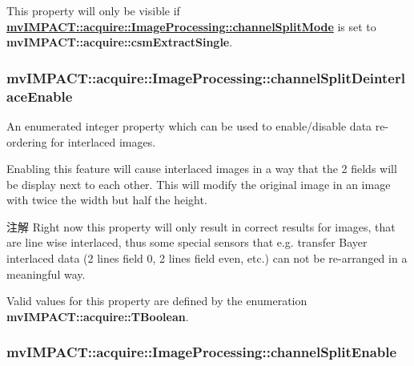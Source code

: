 This property will only be visible if {\bfseries \hyperlink{classmv_i_m_p_a_c_t_1_1acquire_1_1_image_processing_a29e6579bdae98ea9fe26b5f982b8cf24}{mv\+I\+M\+P\+A\+C\+T\+::acquire\+::\+Image\+Processing\+::channel\+Split\+Mode}} is set to {\bfseries mv\+I\+M\+P\+A\+C\+T\+::acquire\+::csm\+Extract\+Single}. \hypertarget{classmv_i_m_p_a_c_t_1_1acquire_1_1_image_processing_addba5c4a6e43745b7e4445cb60c89287}{
\subsubsection[{channel\+Split\+Deinterlace\+Enable}]{ mv\+I\+M\+P\+A\+C\+T\+::acquire\+::\+Image\+Processing\+::channel\+Split\+Deinterlace\+Enable}}\label{classmv_i_m_p_a_c_t_1_1acquire_1_1_image_processing_addba5c4a6e43745b7e4445cb60c89287}


An enumerated integer property which can be used to enable/disable data re-\/ordering for interlaced images. 

Enabling this feature will cause interlaced images in a way that the 2 fields will be display next to each other. This will modify the original image in an image with twice the width but half the height.

\begin{DoxyNote}{注解}
Right now this property will only result in correct results for images, that are line wise interlaced, thus some special sensors that e.\+g. transfer Bayer interlaced data (2 lines field 0, 2 lines field even, etc.) can not be re-\/arranged in a meaningful way.
\end{DoxyNote}
Valid values for this property are defined by the enumeration {\bfseries mv\+I\+M\+P\+A\+C\+T\+::acquire\+::\+T\+Boolean}. \hypertarget{classmv_i_m_p_a_c_t_1_1acquire_1_1_image_processing_a180de0eae56f31ec62fba059da8345ef}{
\subsubsection[{channel\+Split\+Enable}]{ mv\+I\+M\+P\+A\+C\+T\+::acquire\+::\+Image\+Processing\+::channel\+Split\+Enable}}\label{classmv_i_m_p_a_c_t_1_1acquire_1_1_image_processing_a180de0eae56f31ec62fba059da8345ef}



